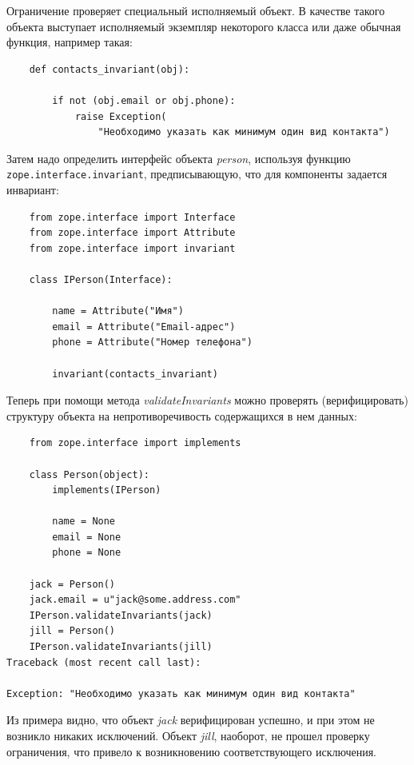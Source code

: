 \documentclass[a4paper,openany,twoside,draft]{book}
\providecommand*{\DUroletitlereference}[1]{\textsl{#1}}
\begin{document}
Ограничение проверяет специальный исполняемый объект.  В качестве такого объекта выступает исполняемый экземпляр некоторого класса или даже обычная функция, например такая:

\begin{verbatim}
    def contacts_invariant(obj):

        if not (obj.email or obj.phone):
            raise Exception(
                "Необходимо указать как минимум один вид контакта")
\end{verbatim}

Затем надо определить интерфейс объекта \DUroletitlereference{person}, используя функцию \texttt{zope.interface.invariant}, предписывающую, что для компоненты задается инвариант:

\begin{verbatim}
    from zope.interface import Interface
    from zope.interface import Attribute
    from zope.interface import invariant

    class IPerson(Interface):

        name = Attribute("Имя")
        email = Attribute("Email-адрес")
        phone = Attribute("Номер телефона")

        invariant(contacts_invariant)
\end{verbatim}

Теперь при помощи метода \DUroletitlereference{validateInvariants} можно проверять (верифицировать) структуру объекта на непротиворечивость содержащихся в нем данных:

\begin{verbatim}
    from zope.interface import implements

    class Person(object):
        implements(IPerson)

        name = None
        email = None
        phone = None

    jack = Person()
    jack.email = u"jack@some.address.com"
    IPerson.validateInvariants(jack)
    jill = Person()
    IPerson.validateInvariants(jill)
Traceback (most recent call last):

Exception: "Необходимо указать как минимум один вид контакта"
\end{verbatim}

Из примера видно, что объект \DUroletitlereference{jack} верифицирован успешно, и при этом не возникло никаких исключений.  Объект \DUroletitlereference{jill}, наоборот, не прошел проверку ограничения, что привело к возникновению соответствующего исключения.
\end{document}
